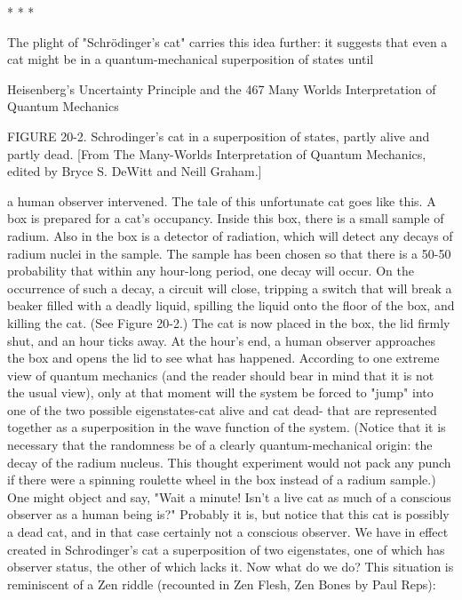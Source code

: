                                         *      *       *

       The plight of "Schrödinger’s cat" carries this idea further: it suggests that even
a cat might be in a quantum-mechanical superposition of states until




Heisenberg's Uncertainty Principle and the                                           467
Many Worlds Interpretation of Quantum Mechanics

FIGURE 20-2. Schrodinger's cat in a superposition of states, partly alive and partly
dead. [From The Many-Worlds Interpretation of Quantum Mechanics, edited by
Bryce S. DeWitt and Neill Graham.]

a human observer intervened. The tale of this unfortunate cat goes like this. A box is
prepared for a cat's occupancy. Inside this box, there is a small sample of radium.
Also in the box is a detector of radiation, which will detect any decays of radium
nuclei in the sample. The sample has been chosen so that there is a 50-50 probability
that within any hour-long period, one decay will occur. On the occurrence of such a
decay, a circuit will close, tripping a switch that will break a beaker filled with a
deadly liquid, spilling the liquid onto the floor of the box, and killing the cat. (See
Figure 20-2.)
        The cat is now placed in the box, the lid firmly shut, and an hour ticks away.
At the hour's end, a human observer approaches the box and opens the lid to see what
has happened. According to one extreme view of quantum mechanics (and the reader
should bear in mind that it is not the usual view), only at that moment will the system
be forced to "jump" into one of the two possible eigenstates-cat alive and cat dead-
that are represented together as a superposition in the wave function of the system.
(Notice that it is necessary that the randomness be of a clearly quantum-mechanical
origin: the decay of the radium nucleus. This thought experiment would not pack any
punch if there were a spinning roulette wheel in the box instead of a radium sample.)
        One might object and say, "Wait a minute! Isn't a live cat as much of a
conscious observer as a human being is?" Probably it is, but notice that this cat is
possibly a dead cat, and in that case certainly not a conscious observer. We have in
effect created in Schrodinger's cat a superposition of two eigenstates, one of which
has observer status, the other of which lacks it. Now what do we do? This situation is
reminiscent of a Zen riddle (recounted in Zen Flesh, Zen Bones by Paul Reps):




